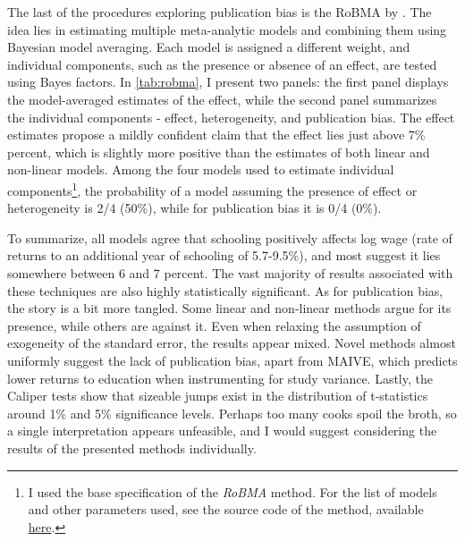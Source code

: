 The last of the procedures exploring publication bias is the \ac{RoBMA} by \cite{maier2022robust}. The idea lies in estimating multiple meta-analytic models and combining them using Bayesian model averaging. Each model is assigned a different weight, and individual components, such as the presence or absence of an effect, are tested using Bayes factors. In \autoref{tab:robma}, I present two panels: the first panel displays the model-averaged estimates of the effect, while the second panel summarizes the individual components - effect, heterogeneity, and publication bias. The effect estimates propose a mildly confident claim that the effect lies just above 7\% percent, which is slightly more positive than the estimates of both linear and non-linear models. Among the four models used to estimate individual components\footnote{I used the base specification of the \textit{RoBMA} method. For the list of models and other parameters used, see the source code of the method, available \href{https://github.com/FBartos/RoBMA/}{here}.}, the probability of a model assuming the presence of effect or heterogeneity is 2/4 (50\%), while for publication bias it is 0/4 (0\%).


To summarize, all models agree that schooling positively affects log wage (rate of returns to an additional year of schooling of 5.7-9.5\%), and most suggest it lies somewhere between 6 and 7 percent. The vast majority of results associated with these techniques are also highly statistically significant. As for publication bias, the story is a bit more tangled. Some linear and non-linear methods argue for its presence, while others are against it. Even when relaxing the assumption of exogeneity of the standard error, the results appear mixed. Novel methods almost uniformly suggest the lack of publication bias, apart from \ac{MAIVE}, which predicts lower returns to education when instrumenting for study variance. Lastly, the Caliper tests show that sizeable jumps exist in the distribution of t-statistics around 1\% and 5\% significance levels. Perhaps too many cooks spoil the broth, so a single interpretation appears unfeasible, and I would suggest considering the results of the presented methods individually.